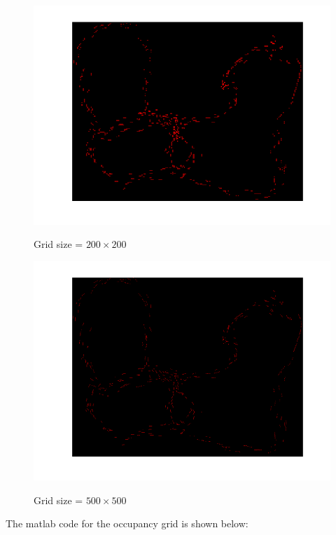 {		\begin{figure}[position = here]
			\begin{centering}
				\includegraphics[scale=1]{./images/q2/heatmap_path_200.png}\\
				\caption{Grid size = ${200 \times 200}$}
			\end{centering}
		\end{figure}
		\newline
		
		\begin{figure}[position = here]
			\begin{centering}
				\includegraphics[scale=1]{./images/q2/heatmap_path_500.png}\\
				\caption{Grid size = ${500 \times 500}$}
			\end{centering}
		\end{figure}
		\newline
		\pagebreak
		The matlab code for the occupancy grid is shown below:
		
	
}
